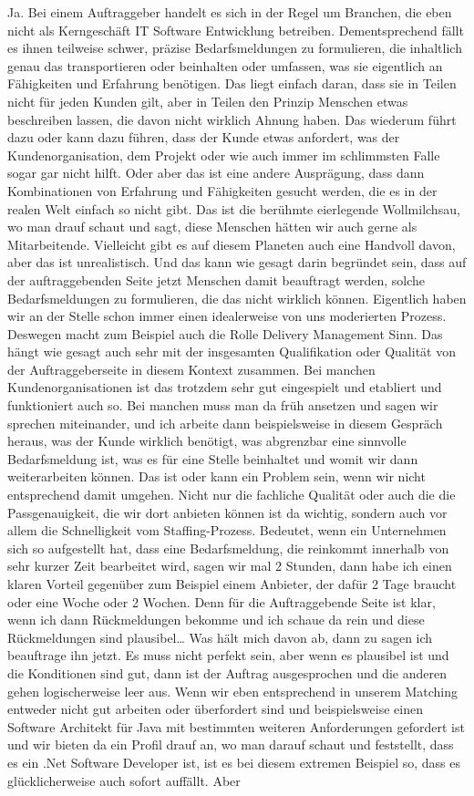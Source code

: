 Ja. Bei einem Auftraggeber handelt es sich in der Regel um Branchen, die eben nicht als Kerngeschäft IT Software Entwicklung betreiben. Dementsprechend fällt es ihnen teilweise schwer, präzise Bedarfsmeldungen zu formulieren, die inhaltlich genau das transportieren oder beinhalten oder umfassen, was sie eigentlich an Fähigkeiten und Erfahrung benötigen. Das liegt einfach daran, dass sie in Teilen nicht für jeden Kunden gilt, aber in Teilen den Prinzip Menschen etwas beschreiben lassen, die davon nicht wirklich Ahnung haben. Das wiederum führt dazu oder kann dazu führen, dass der Kunde etwas anfordert, was der Kundenorganisation, dem Projekt oder wie auch immer im schlimmsten Falle sogar gar nicht hilft. Oder aber das ist eine andere Ausprägung, dass dann Kombinationen von Erfahrung und Fähigkeiten gesucht werden, die es in der realen Welt einfach so nicht gibt. Das ist die berühmte eierlegende Wollmilchsau, wo man drauf schaut und sagt, diese Menschen hätten wir auch gerne als Mitarbeitende. Vielleicht gibt es auf diesem Planeten auch eine Handvoll davon, aber das ist unrealistisch. Und das kann wie gesagt darin begründet sein, dass auf der auftraggebenden Seite jetzt Menschen damit beauftragt werden, solche Bedarfsmeldungen zu formulieren, die das nicht wirklich können. Eigentlich haben wir an der Stelle schon immer einen idealerweise von uns moderierten Prozess. Deswegen macht zum Beispiel auch die Rolle Delivery Management Sinn. Das hängt wie gesagt auch sehr mit der insgesamten Qualifikation oder Qualität von der Auftraggeberseite in diesem Kontext zusammen. Bei manchen Kundenorganisationen ist das trotzdem sehr gut eingespielt und etabliert und funktioniert auch so. Bei manchen muss man da früh ansetzen und sagen wir sprechen miteinander, und ich arbeite dann beispielsweise in diesem Gespräch heraus, was der Kunde wirklich benötigt, was abgrenzbar eine sinnvolle Bedarfsmeldung ist, was es für eine Stelle beinhaltet und womit wir dann weiterarbeiten können. Das ist oder kann ein Problem sein, wenn wir nicht entsprechend damit umgehen. Nicht nur die fachliche Qualität oder auch die die Passgenauigkeit, die wir dort anbieten können ist da wichtig, sondern auch vor allem die Schnelligkeit vom Staffing-Prozess. Bedeutet, wenn ein Unternehmen sich so aufgestellt hat, dass eine Bedarfsmeldung, die reinkommt innerhalb von sehr kurzer Zeit bearbeitet wird, sagen wir mal 2 Stunden, dann habe ich einen klaren Vorteil gegenüber zum Beispiel einem Anbieter, der dafür 2 Tage braucht oder eine Woche oder 2 Wochen. Denn für die Auftraggebende Seite ist klar, wenn ich dann Rückmeldungen bekomme und ich schaue da rein und diese Rückmeldungen sind plausibel… Was hält mich davon ab, dann zu sagen ich beauftrage ihn jetzt. Es muss nicht perfekt sein, aber wenn es plausibel ist und die Konditionen sind gut, dann ist der Auftrag ausgesprochen und die anderen gehen logischerweise leer aus. Wenn wir eben entsprechend in unserem Matching entweder nicht gut arbeiten oder überfordert sind und beispielsweise einen Software Architekt für Java mit bestimmten weiteren Anforderungen gefordert ist und wir bieten da ein Profil drauf an, wo man darauf schaut und feststellt, dass es ein .Net Software Developer ist, ist es bei diesem extremen Beispiel so, dass es glücklicherweise auch sofort auffällt. Aber 